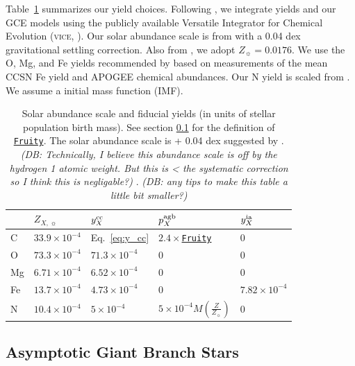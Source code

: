 \documentclass[fleqn,
referee, %
usenatbib]{mnras}
\newcommand{\VICE}{\textsc{vice}}
\newcommand{\fruity}{\texttt{\hyperlink{fruity}{Fruity}}}
\newcommand{\cfactor}{2.4}
\newcommand{\y}{p}
\newcommand{\Zo}{ Z_{\sun}}
\newcommand{\dbnote}[1]{ {\color{Thistle} \textit{\small (DB: #1)}} }
\begin{document}
Table~\ref{tab:fiducial_mod} summarizes our yield choices. 
Following \citet{james+23}, we integrate yields and our GCE models using the publicly available Versatile Integrator for Chemical Evolution (\VICE, \citealt{JW20}). Our solar abundance scale is from \citet{magg+22} with a 0.04 dex gravitational settling correction. Also from \citet{magg+22}, we adopt $\Zo = 0.0176$. We use the O, Mg, and Fe yields recommended by \citet{david_fe} based on measurements of the mean CCSN Fe yield \citep{rodriguez+23} and APOGEE chemical abundances.
Our N yield is scaled from \citep{james+23}.
We assume a \citet{kroupa01} initial mass function (IMF).


\begin{table}
	\centering
    \caption[]{Solar abundance scale and fiducial yields (in units of stellar population birth mass). See section \ref{sec:agb} for the definition of \fruity. The solar abundance scale is \citet{magg+22} + 0.04 dex suggested by \citet{david_fe}.
        \dbnote{Technically, I believe this abundance scale is off by the hydrogen 1 atomic weight. But this is < the systematic correction so I think this is negligable?}.
    \dbnote{any tips to make this table a little bit smaller?}
    }
	\label{tab:fiducial_mod}

	\begin{tabular}{l l l l l}
		\hline
         & $Z_{X,\,\sun}$ & $y_X^{\rm cc}$ & $\y_X^{\rm agb}$ & $y_X^{\rm ia}$  \\
		\hline
        C & $33.9\times10^{-4}$ & Eq.~\ref{eq:y_cc} & $\cfactor\times$\fruity &  0 \\
        O & $73.3\times10^{-4}$ & $71.3\times10^{-4}$ & 0 & 0 \\
        Mg & $6.71\times10^{-4}$ & $6.52\times 10^{-4}$ & 0 & 0 \\
        Fe & $13.7\times10^{-4}$ & $4.73\times10^{-4}$ & 0 & $7.82\times10^{-4}$ \\
        N & $10.4\times10^{-4}$ & $5\times10^{-4}$ & $5\times10^{-4}M\left(\frac{Z}{\Zo}\right)$ & 0\\
		\hline
	\end{tabular}
\end{table}


\subsection{Asymptotic Giant Branch Stars}\label{sec:agb}
\end{document}
